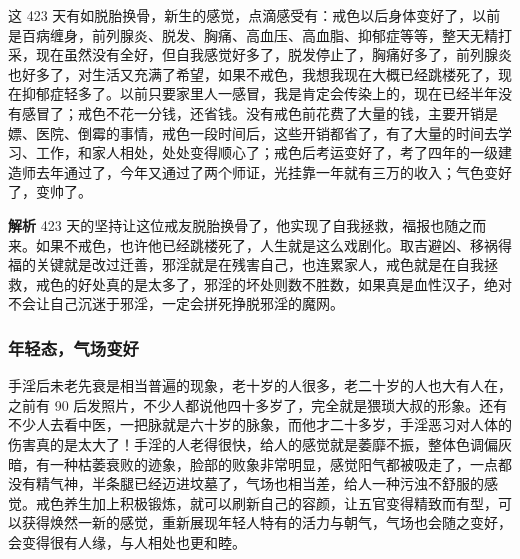\begin{case}\label{JiezheDianfengTiyan-HuanranxinshengdeGanjue}
    这 423 天有如脱胎换骨，新生的感觉，点滴感受有：戒色以后身体变好了，以前是百病缠身，前列腺炎、脱发、胸痛、高血压、高血脂、抑郁症等等，整天无精打采，现在虽然没有全好，但自我感觉好多了，脱发停止了，胸痛好多了，前列腺炎也好多了，对生活又充满了希望，如果不戒色，我想我现在大概已经跳楼死了，现在抑郁症轻多了。以前只要家里人一感冒，我是肯定会传染上的，现在已经半年没有感冒了；戒色不花一分钱，还省钱。没有戒色前花费了大量的钱，主要开销是嫖、医院、倒霉的事情，戒色一段时间后，这些开销都省了，有了大量的时间去学习、工作，和家人相处，处处变得顺心了；戒色后考运变好了，考了四年的一级建造师去年通过了，今年又通过了两个师证，光挂靠一年就有三万的收入；气色变好了，变帅了。

    \textbf{解析} 423 天的坚持让这位戒友脱胎换骨了，他实现了自我拯救，福报也随之而来。如果不戒色，也许他已经跳楼死了，人生就是这么戏剧化。取吉避凶、移祸得福的关键就是改过迁善，邪淫就是在残害自己，也连累家人，戒色就是在自我拯救，戒色的好处真的是太多了，邪淫的坏处则数不胜数，如果真是血性汉子，绝对不会让自己沉迷于邪淫，一定会拼死挣脱邪淫的魔网。
\end{case}

\subsubsection{年轻态，气场变好}

手淫后未老先衰是相当普遍的现象，老十岁的人很多，老二十岁的人也大有人在，之前有 90 后发照片，不少人都说他四十多岁了，完全就是猥琐大叔的形象。还有不少人去看中医，一把脉就是六十岁的脉象，而他才二十多岁，手淫恶习对人体的伤害真的是太大了！手淫的人老得很快，给人的感觉就是萎靡不振，整体色调偏灰暗，有一种枯萎衰败的迹象，脸部的败象非常明显，感觉阳气都被吸走了，一点都没有精气神，半条腿已经迈进坟墓了，气场也相当差，给人一种污浊不舒服的感觉。戒色养生加上积极锻炼，就可以刷新自己的容颜，让五官变得精致而有型，可以获得焕然一新的感觉，重新展现年轻人特有的活力与朝气，气场也会随之变好，会变得很有人缘，与人相处也更和睦。

